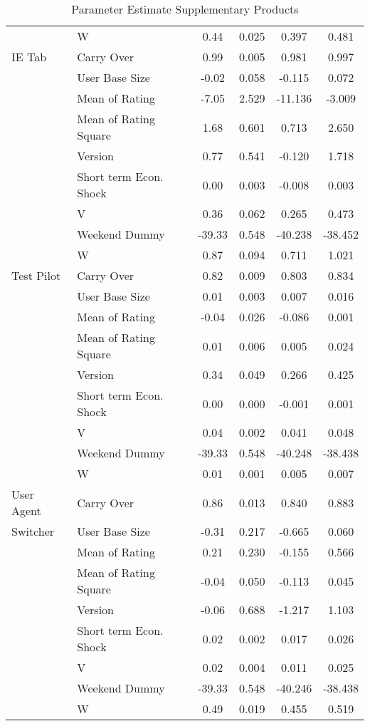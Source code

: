 \documentclass[mksc,nonblindrev]{informs3}
\begin{document}
\begin{table}
\begin{tabular}{llcccc}
	&	W	&	0.44	&	0.025	&	0.397	&	0.481	\\
IE Tab	&	Carry Over	&	0.99	&	0.005	&	0.981	&	0.997	\\
	&	User Base Size	&	-0.02	&	0.058	&	-0.115	&	0.072	\\
	&	Mean of Rating	&	-7.05	&	2.529	&	-11.136	&	-3.009	\\
	&	Mean of Rating Square	&	1.68	&	0.601	&	0.713	&	2.650	\\
	&	Version	&	0.77	&	0.541	&	-0.120	&	1.718	\\
	&	Short term Econ. Shock	&	0.00	&	0.003	&	-0.008	&	0.003	\\
	&	V	&	0.36	&	0.062	&	0.265	&	0.473	\\
	&	Weekend Dummy	&	-39.33	&	0.548	&	-40.238	&	-38.452	\\
	&	W	&	0.87	&	0.094	&	0.711	&	1.021	\\
Test Pilot	&	Carry Over	&	0.82	&	0.009	&	0.803	&	0.834	\\
	&	User Base Size	&	0.01	&	0.003	&	0.007	&	0.016	\\
	&	Mean of Rating	&	-0.04	&	0.026	&	-0.086	&	0.001	\\
	&	Mean of Rating Square	&	0.01	&	0.006	&	0.005	&	0.024	\\
	&	Version	&	0.34	&	0.049	&	0.266	&	0.425	\\
	&	Short term Econ. Shock	&	0.00	&	0.000	&	-0.001	&	0.001	\\
	&	V	&	0.04	&	0.002	&	0.041	&	0.048	\\
	&	Weekend Dummy	&	-39.33	&	0.548	&	-40.248	&	-38.438	\\
	&	W	&	0.01	&	0.001	&	0.005	&	0.007	\\
User Agent	&	Carry Over	&	0.86	&	0.013	&	0.840	&	0.883	\\
 Switcher	&	User Base Size	&	-0.31	&	0.217	&	-0.665	&	0.060	\\
	&	Mean of Rating	&	0.21	&	0.230	&	-0.155	&	0.566	\\
	&	Mean of Rating Square	&	-0.04	&	0.050	&	-0.113	&	0.045	\\
	&	Version	&	-0.06	&	0.688	&	-1.217	&	1.103	\\
	&	Short term Econ. Shock	&	0.02	&	0.002	&	0.017	&	0.026	\\
	&	V	&	0.02	&	0.004	&	0.011	&	0.025	\\
	&	Weekend Dummy	&	-39.33	&	0.548	&	-40.246	&	-38.438	\\
	&	W	&	0.49	&	0.019	&	0.455	&	0.519	\\

		\end{tabular}
	\caption{Parameter Estimate Supplementary Products}
	\label{tab:ParameterEstimateSupplementaryProducts}
\end{table}
\end{document}
